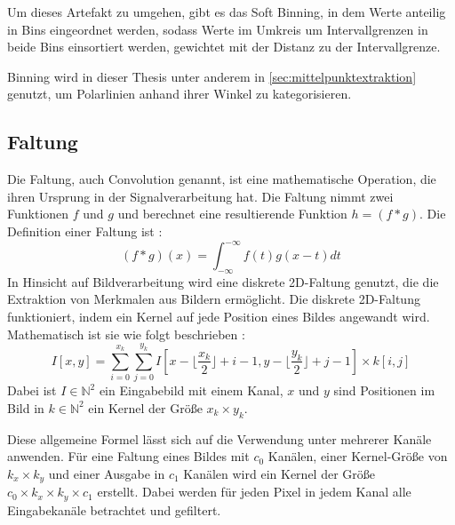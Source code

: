 Um dieses Artefakt zu umgehen, gibt es das Soft Binning, in dem Werte anteilig in Bins eingeordnet werden, sodass Werte im Umkreis um Intervallgrenzen in beide Bins einsortiert werden, gewichtet mit der Distanz zu der Intervallgrenze.

Binning wird in dieser Thesis unter anderem in \autoref{sec:mittelpunktextraktion} genutzt, um Polarlinien anhand ihrer Winkel zu kategorisieren.


\subsection{Faltung}
\label{sec:was_filterung}

Die Faltung, auch Convolution genannt, ist eine mathematische Operation, die ihren Ursprung in der Signalverarbeitung hat. Die Faltung nimmt zwei Funktionen $f$ und $g$ und berechnet eine resultierende Funktion $h = (f * g)$. Die Definition einer Faltung ist \cite{convolution,cv_general}:
\[ (f*g)(x) = \int_{-\infty}^{-\infty} f(t) g(x-t) dt\]
In Hinsicht auf Bildverarbeitung wird eine diskrete 2D-Faltung genutzt, die die Extraktion von Merkmalen aus Bildern ermöglicht. Die diskrete 2D-Faltung funktioniert, indem ein Kernel auf jede Position eines Bildes angewandt wird. Mathematisch ist sie wie folgt beschrieben \cite{discrete_convolution}:
\[ I[x, y] = \sum_{i=0}^{x_k} \sum_{j=0}^{y_k} I[x - \lfloor\frac{x_k}{2}\rfloor + i - 1, y - \lfloor \frac{y_k}{2} \rfloor + j - 1] \times k[i, j] \]
Dabei ist $I \in \mathbb{N}^2$ ein Eingabebild mit einem Kanal, $x$ und $y$ sind Positionen im Bild in $k \in \mathbb{N}^2$ ein Kernel der Größe $x_k \times y_k$.

Diese allgemeine Formel lässt sich auf die Verwendung unter mehrerer Kanäle anwenden. Für eine Faltung eines Bildes mit $c_0$ Kanälen, einer Kernel-Größe von $k_x \times k_y$ und einer Ausgabe in $c_1$ Kanälen wird ein Kernel der Größe $ c_0 \times k_x \times k_y \times c_1$ erstellt. Dabei werden für jeden Pixel in jedem Kanal alle Eingabekanäle betrachtet und gefiltert.

